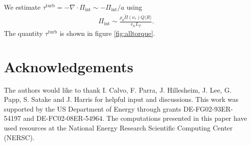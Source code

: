 \documentclass[aip, pop, preprint]{revtex4-1}
\numberwithin{figure}{section}
\numberwithin{equation}{section}
\begin{document}
We estimate $\tau^{\text{turb}} = - \nabla \cdot \Pi_{\text{int}} \sim -\Pi_{\text{int}}/a$ using 
\begin{gather}
\Pi_{\text{int}} \sim \frac{\rho_{\theta} \widetilde{\Pi}(\nu_*) Q \langle R \rangle}{v_{ti} L_T}.
\end{gather}
The quantity $\tau^{\text{turb}}$ is shown in figure \ref{fig:alltorque}.

\FloatBarrier

\section*{Acknowledgements}
The authors would like to thank I. Calvo, F. Parra, J. Hillesheim, J. Lee, G. Papp, S. Satake and J. Harris for helpful input and discussions. This work was supported by the US Department of Energy through grants DE-FG02-93ER-54197 and DE-FC02-08ER-54964. The computations presented in this paper have used resources at the National Energy Research Scientific Computing Center (NERSC). 


\end{document}

